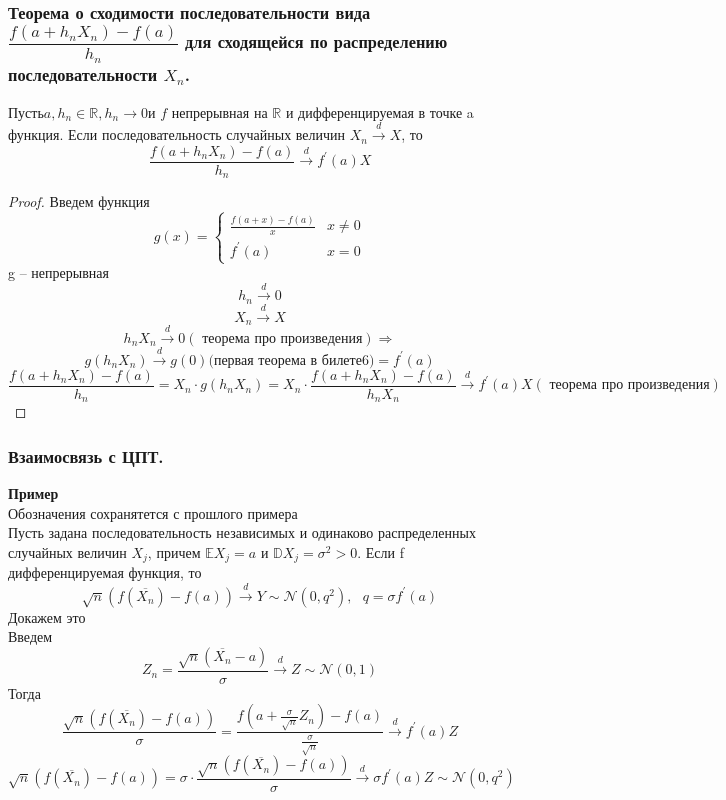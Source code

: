	\subsubsection{Теорема о сходимости последовательности вида $\dfrac{f(a + h_n X_n) - f(a)}{h_n}$ для сходящейся по распределению последовательности $X_n$. }
	\begin{theorem*}
		Пусть$  a, h_n \in \mathbb{R}, h_n\to0 $и $ f $ непрерывная на $ \mathbb{R} $ и дифференцируемая в точке a функция. Если последовательность случайных величин $ X_n \xrightarrow{d} X $, то
		$$\frac{f(a + h_nX_n) - f(a)}{h_n}\xrightarrow{d}f^{'}(a)X$$
	\end{theorem*}
	\begin{proof}
		Введем функция
		\begin{equation*}
			g(x) = 
			\begin{cases}
				\frac{f(a + x) - f(a)}{x} & x\neq 0\\
				f^{'}(a) & x = 0
			\end{cases}
		\end{equation*}
		g -- непрерывная
		$$h_n\xrightarrow{d} 0$$
		$$X_n\xrightarrow{d}X$$
		$$h_nX_n\xrightarrow{d}0(\text{ теорема про произведения})\Rightarrow$$
		$$g(h_nX_n)\xrightarrow{d}g(0)\text{(первая теорема в билете6)} = f^{'}(a)$$
		$$\frac{f(a + h_nX_n) - f(a)}{h_n} = X_n\cdot g(h_nX_n) = X_n\cdot\frac{f(a + h_nX_n) - f(a)}{h_nX_n} \xrightarrow{d}f^{'}(a)X(\text{ теорема про произведения})$$
	\end{proof}
	\subsubsection{Взаимосвязь с ЦПТ.}
	\textbf{Пример}\\
	Обозначения сохранятется с прошлого примера\\
	Пусть задана последовательность независимых и одинаково распределенных
	случайных величин $ X_j $, причем $  \mathbb{E}X_j = a$ и $\mathbb{D}X_j = \sigma^2 > 0 $. Если f дифференцируемая функция, то
	$$\sqrt{n}(f(\overline{X_n}) - f(a))\xrightarrow{d}Y\sim\mathcal{N}(0, q^2),\text{ }q=\sigma f^{'}(a)$$
	Докажем это\\
	Введем
	$$ Z_n = \frac{\sqrt{n}(\overline{X_n} - a)}{\sigma}\xrightarrow{d}Z\sim\mathcal{N}(0,1)$$
	Тогда
	$$\frac{\sqrt{n}(f(\overline{X_n}) - f(a))}{\sigma} = \frac{f(a + \frac{\sigma}{\sqrt{n}} Z_n) - f(a)}{\frac{\sigma}{\sqrt{n}}}\xrightarrow{d}f^{'}(a)Z$$
	$$\sqrt{n}(f(\overline{X_n}) - f(a)) = \sigma \cdot \frac{\sqrt{n}(f(\overline{X_n}) - f(a))}{\sigma}\xrightarrow{d}\sigma f^{'}(a)Z\sim \mathcal{N}(0, q^2)$$
